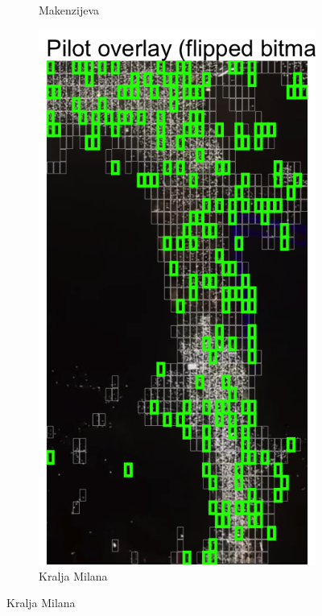 \documentclass[a4paper,12pt]{article}
\begin{document}
\begin{figure}[H]
\begin{subfigure}[b]{0.3\textwidth}
	  \caption{Makenzijeva}
	  \label{fig:makenzijeva}
	\end{subfigure}
	\hfill
	\begin{subfigure}[b]{0.3\textwidth}
	  \centering
	  \includegraphics[width=\textwidth]{../outputs/sampling_outputs/main_overlays_image/main_overlay_kralja-milana.png}
	  \caption{Kralja Milana}

\end{subfigure}
\end{figure}
\end{document}
